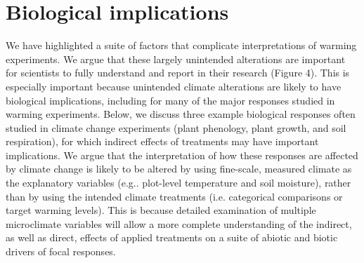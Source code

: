 \documentclass{article}
\begin{document}
\section* {Biological implications}
\par We have highlighted a suite of factors that complicate interpretations of warming experiments. We argue that these largely unintended alterations are important for scientists to fully understand and report in their research (Figure 4). This is especially important because unintended climate alterations are likely to have biological implications, including for many of the major responses studied in warming experiments. Below, we discuss three example biological responses often studied in climate change experiments (plant phenology, plant growth, and soil respiration), for which indirect effects of treatments may have important implications. We argue that the interpretation of how these responses are affected by climate change is likely to be altered by using fine-scale, measured climate as the explanatory variables (e.g.. plot-level temperature and soil moisture), rather than by using the intended climate treatments (i.e. categorical comparisons or target warming levels). This is because detailed examination of multiple microclimate variables will allow a more complete understanding of the indirect, as well as direct, effects of applied treatments on a suite of abiotic and biotic drivers of focal responses.
\end{document}
